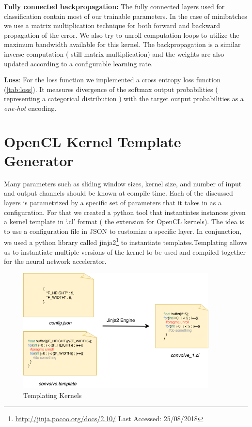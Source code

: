 \textbf{Fully connected backpropagation:} The fully connected layers used for classification contain most of our trainable parameters. In the case of minibatches we use a matrix multiplication technique for both forward and backward propagation of the error. We also try to unroll computation loops to utilize the maximum bandwidth available for this kernel. The backpropagation is a similar inverse computation ( still matrix multiplication)  and the weights are also updated according to a configurable learning rate.

\textbf{Loss}: For the loss function we implemented a cross entropy loss function (\ref{tab:loss}). It measures divergence of the softmax output probabilities ( representing a categorical distribution ) with the target output probabilities as a \emph{one-hot} encoding.

\section{OpenCL Kernel Template Generator}

Many parameters such as sliding window sizes, kernel size, and number of input and output channels should be known at compile time. Each of the discussed layers is parametrized by a specific set of parameters that it takes in as a configuration. For that we created a python tool that instantiates instances  given a kernel template in ‘.cl’ format ( the extension for OpenCL kernels). The idea is to use a configuration file in JSON to customize a specific layer. In conjunction, we used a python library called jinja2\footnote{\url{http://jinja.pocoo.org/docs/2.10/} Last Accessed: 25/08/2018} to instantiate templates.Templating allows us to instantiate multiple versions of the kernel to be used and compiled together for the neural network accelerator.


\begin{figure}[h!]
\centering
\includegraphics[width=0.9\textwidth]{Figures/jinja}
\decoRule
\caption[Templating Kernels]{ Templating Kernels }
\label{fig:jinja}
\end{figure}

